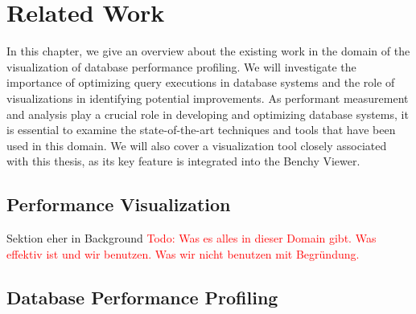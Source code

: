 
\chapter{Related Work}\label{chapter:relatedWork}
In this chapter, we give an overview about the existing work in the domain of the visualization of database performance profiling.
We will investigate the importance of optimizing query executions in database systems and the role of visualizations in identifying potential improvements.
As performant measurement and analysis play a crucial role in developing and optimizing database systems, 
it is essential to examine the state-of-the-art techniques and tools that have been used in this domain.
We will also cover a visualization tool closely associated with this thesis, as its key feature is integrated into the Benchy Viewer.

\section{Performance Visualization}
Sektion eher in Background
\textcolor{red}{Todo: Was es alles in dieser Domain gibt. Was effektiv ist und wir benutzen. Was wir nicht benutzen  mit Begründung.  }

\section{Database Performance Profiling }

